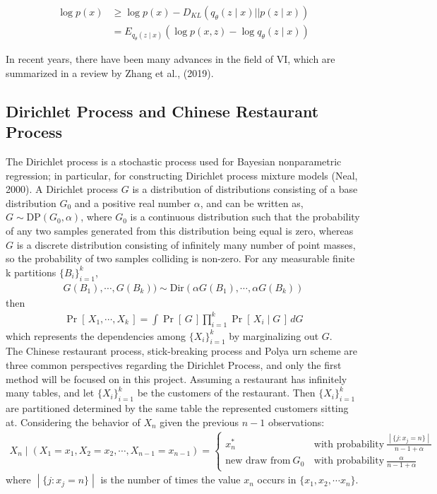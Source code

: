 \documentclass{article}
\newcommand{\prob}[1]{\operatorname{Pr}\left[\,#1\,\right]}
\def\cond{\; | \;}
\begin{document}
\begin{align*}
\log{p(x)} &\geq \log p(x) - D_{KL}(q_\theta(z\mid x)||p(z\mid x))\\
		   &= E_{q_\theta(z\mid x)}(\log p(x,z)-\log q_\theta (z\mid x))
\end{align*}

In recent years, there have been many advances in the field of VI, which are summarized in a review by Zhang et al., (2019).

\subsection{Dirichlet Process and Chinese Restaurant Process}

The Dirichlet process is a stochastic process used for Bayesian nonparametric regression; in particular, for constructing Dirichlet process mixture models (Neal, 2000). A Dirichlet process $G$ is a distribution of distributions consisting of a base distribution $G_0$ and a positive real number $\alpha$, and can be written as, $G \sim \text{DP}(G_0, \alpha)$, where $G_0$ is a continuous distribution such that the probability of any two samples generated from this distribution being equal is zero, whereas $G$ is a discrete distribution consisting of infinitely many number of point masses,  so the probability of two samples colliding is non-zero.  For any measurable finite k partitions $\{B_i\}_{i=1}^k$,
\begin{align*}
G(B_1), \cdots, G(B_k))\sim \text{Dir}(\alpha G(B_1), \cdots, \alpha G(B_k))
\end{align*}
then
\begin{align*}
\prob{X_1, \cdots, X_k} = \int \prob{G} \prod_{i=1}^k \prob{X_i\cond G}\,dG
\end{align*}
which represents the dependencies among $\{X_i\}_{i=1}^k$ by marginalizing out $G$. \\

The Chinese restaurant process, stick-breaking process and Polya urn scheme are three common perspectives regarding the Dirichlet Process, and only the first method will be focused on in this project.  Assuming a restaurant has infinitely many tables,  and let $\{X_i\}_{i=1}^k$ be the customers of the restaurant.  Then $\{X_i\}_{i=1}^k$ are partitioned determined by the same table the represented customers sitting at.  Considering the behavior of $X_n$ given the previous $n-1$ observations:
\begin{align*}
X_n\cond (X_1 = x_1, X_2 = x_2, \cdots,  X_{n-1} = x_{n-1}) = \left\{
\begin{array}{rl}
x_n^* \, &\text{with probability}\ \frac{\cond\{j : x_j = n\}\cond}{n - 1 + \alpha}\\
\text{new draw from}\ G_0\, &\text{with probability}\  \frac{\alpha}{n - 1 + \alpha}
\end{array}
\right.
\end{align*}
where $\cond \{j: x_j = n\}\cond$ is the number of times the value $x_n$ occurs in $\{x_1, x_2, \cdots x_n\}$.
\end{document}
